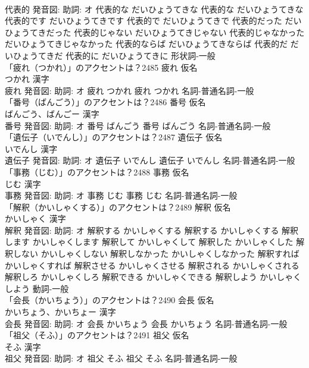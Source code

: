 \documentclass[8pt]{extreport}
\begin{document}
\begin{CJK}{UTF8}{min}
\\	代表的 発音図: 助詞: オ	代表的な だいひょうてきな		代表的な だいひょうてきな 代表的です だいひょうてきです 代表的で だいひょうてきで 代表的だった だいひょうてきだった 代表的じゃない だいひょうてきじゃない 代表的じゃなかった だいひょうてきじゃなかった 代表的ならば だいひょうてきならば 代表的だ だいひょうてきだ 代表的に だいひょうてきに				形状詞-一般 
\\	「疲れ（つかれ）」のアクセントは？2485	疲れ 仮名　
\\	つかれ 漢字　
\\	疲れ 発音図: 助詞: オ	疲れ つかれ		疲れ つかれ				名詞-普通名詞-一般 
\\	「番号（ばんごう）」のアクセントは？2486	番号 仮名　
\\	ばんごう、ばんごー 漢字　
\\	番号 発音図: 助詞: オ	番号 ばんごう		番号 ばんごう				名詞-普通名詞-一般 
\\	「遺伝子（いでんし）」のアクセントは？2487	遺伝子 仮名　
\\	いでんし 漢字　
\\	遺伝子 発音図: 助詞: オ	遺伝子 いでんし		遺伝子 いでんし				名詞-普通名詞-一般 
\\	「事務（じむ）」のアクセントは？2488	事務 仮名　
\\	じむ 漢字　
\\	事務 発音図: 助詞: オ	事務 じむ		事務 じむ				名詞-普通名詞-一般 
\\	「解釈（かいしゃくする）」のアクセントは？2489	解釈 仮名　
\\	かいしゃく 漢字　
\\	解釈 発音図: 助詞: オ	解釈する かいしゃくする		解釈する かいしゃくする 解釈します かいしゃくします 解釈して かいしゃくして 解釈した かいしゃくした 解釈しない かいしゃくしない 解釈しなかった かいしゃくしなかった 解釈すれば かいしゃくすれば 解釈させる かいしゃくさせる 解釈される かいしゃくされる 解釈しろ かいしゃくしろ 解釈できる かいしゃくできる 解釈しよう かいしゃくしよう				動詞-一般 
\\	「会長（かいちょう）」のアクセントは？2490	会長 仮名　
\\	かいちょう、かいちょー 漢字　
\\	会長 発音図: 助詞: オ	会長 かいちょう		会長 かいちょう				名詞-普通名詞-一般 
\\	「祖父（そふ）」のアクセントは？2491	祖父 仮名　
\\	そふ 漢字　
\\	祖父 発音図: 助詞: オ	祖父 そふ		祖父 そふ				名詞-普通名詞-一般 

\end{CJK}
\end{document}
